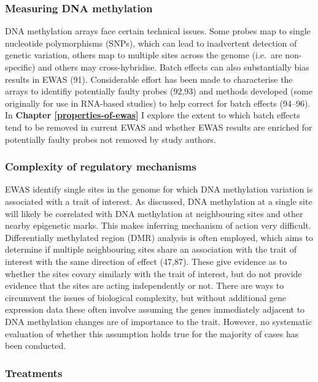 \documentclass[11pt,twoside]{bristolthesis}
\begin{document}
\hypertarget{measuring-dna-methylation}{%
\subsubsection{Measuring DNA methylation}\label{measuring-dna-methylation}}

DNA methylation arrays face certain technical issues. Some probes map to single nucleotide polymorphisms (SNPs), which can lead to inadvertent detection of genetic variation, others map to multiple sites across the genome (i.e.~are non-specific) and others may cross-hybridise. Batch effects can also substantially bias results in EWAS (91). Considerable effort has been made to characterise the arrays to identifiy potentially faulty probes (92,93) and methods developed (some originally for use in RNA-based studies) to help correct for batch effects (94--96). In \textbf{Chapter \ref{properties-of-ewas}} I explore the extent to which batch effects tend to be removed in current EWAS and whether EWAS results are enriched for potentially faulty probes not removed by study authors.

\hypertarget{complexity-of-regulatory-mechanisms}{%
\subsubsection{Complexity of regulatory mechanisms}\label{complexity-of-regulatory-mechanisms}}

EWAS identify single sites in the genome for which DNA methylation variation is associated with a trait of interest. As discussed, DNA methylation at a single site will likely be correlated with DNA methylation at neighbouring sites and other nearby epigenetic marks. This makes inferring mechanism of action very difficult. Differentially methylated region (DMR) analysis is often employed, which aims to determine if multiple neighbouring sites share an association with the trait of interest with the same direction of effect (47,87). These give evidence as to whether the sites covary similarly with the trait of interest, but do not provide evidence that the sites are acting independently or not. There are ways to circumvent the issues of biological complexity, but without additional gene expression data these often involve assuming the genes immediately adjacent to DNA methylation changes are of importance to the trait. However, no systematic evaluation of whether this assumption holds true for the majority of cases has been conducted.

\hypertarget{treatments}{%
\subsubsection{Treatments}\label{treatments}}
\end{document}
